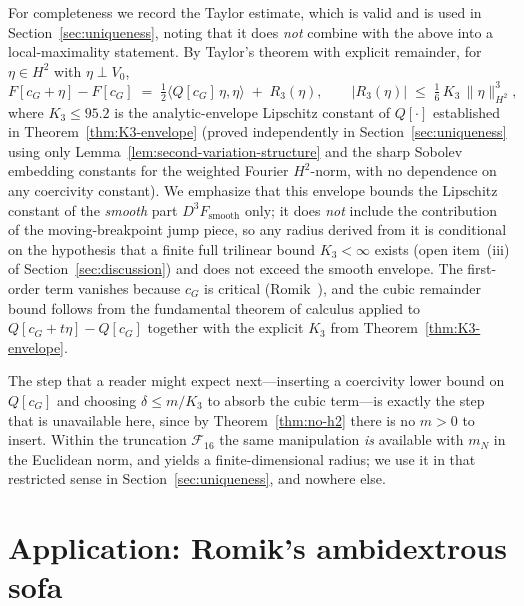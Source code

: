 \documentclass[11pt]{amsart}
\theoremstyle{plain}
\theoremstyle{definition}
\newcommand{\cG}{c_{G}}
\begin{document}
For completeness we record the Taylor estimate, which is valid and is
used in Section~\ref{sec:uniqueness}, noting that it does \emph{not}
combine with the above into a local-maximality statement.
By Taylor's theorem with explicit remainder, for $\eta \in H^{2}$
with $\eta \perp V_{0}$,
\begin{equation}\label{eq:Taylor-explicit}
  F[\cG + \eta] - F[\cG] \;=\; \tfrac{1}{2} \langle Q[\cG]\,\eta,
                                                  \eta \rangle
   \;+\; R_{3}(\eta),
   \qquad
   |R_{3}(\eta)| \;\leq\; \tfrac{1}{6}\, K_{3}\,
                          \|\eta\|_{H^{2}}^{3},
\end{equation}
where $K_{3}\leq 95.2$ is the analytic-envelope Lipschitz constant of
$Q[\cdot]$ established in Theorem~\ref{thm:K3-envelope} (proved
independently in Section~\ref{sec:uniqueness} using only
Lemma~\ref{lem:second-variation-structure} and the sharp Sobolev
embedding constants for the weighted Fourier $H^{2}$-norm, with
no dependence on any coercivity constant).  We emphasize that
this envelope bounds the Lipschitz constant of the \emph{smooth}
part $D^{3}F_{\mathrm{smooth}}$ only; it does \emph{not} include the
contribution of the moving-breakpoint jump piece, so any radius
derived from it is conditional on the hypothesis
that a finite full trilinear bound $K_{3}<\infty$ exists (open
item~(iii) of Section~\ref{sec:discussion}) and does not exceed the
smooth envelope.  The
first-order term vanishes because $\cG$ is critical
(Romik~\cite{Romik2018}), and the cubic remainder bound follows
from the fundamental theorem of calculus applied to $Q[\cG+t\eta] -
Q[\cG]$ together with the explicit $K_{3}$ from
Theorem~\ref{thm:K3-envelope}.

The step that a reader might expect next---inserting a coercivity
lower bound on $Q[\cG]$ and choosing $\delta \leq m/K_{3}$ to absorb
the cubic term---is exactly the step that is unavailable here, since
by Theorem~\ref{thm:no-h2} there is no $m > 0$ to insert.  Within the
truncation $\mathcal{F}_{16}$ the same manipulation \emph{is}
available with $m_{N}$ in the Euclidean norm, and yields a
finite-dimensional radius; we use it in that restricted sense in
Section~\ref{sec:uniqueness}, and nowhere else.



\section{Application: Romik's ambidextrous sofa}\label{sec:romik}
\end{document}
